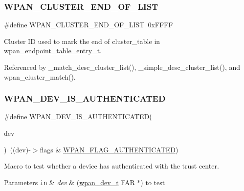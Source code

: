 \subsubsection{\texorpdfstring{W\+P\+A\+N\+\_\+\+C\+L\+U\+S\+T\+E\+R\+\_\+\+E\+N\+D\+\_\+\+O\+F\+\_\+\+L\+I\+ST}{WPAN\_CLUSTER\_END\_OF\_LIST}}
{\footnotesize\ttfamily \#define W\+P\+A\+N\+\_\+\+C\+L\+U\+S\+T\+E\+R\+\_\+\+E\+N\+D\+\_\+\+O\+F\+\_\+\+L\+I\+ST~0x\+F\+F\+FF}



Cluster ID used to mark the end of {\ttfamily cluster\+\_\+table} in \hyperlink{structwpan__endpoint__table__entry__t}{wpan\+\_\+endpoint\+\_\+table\+\_\+entry\+\_\+t}. 



Referenced by \+\_\+match\+\_\+desc\+\_\+cluster\+\_\+list(), \+\_\+simple\+\_\+desc\+\_\+cluster\+\_\+list(), and wpan\+\_\+cluster\+\_\+match().

\mbox{\label{group__wpan__aps_ga5ba1c4d72eeac9bb8bd97ee811d7aa05}} 
\subsubsection{\texorpdfstring{W\+P\+A\+N\+\_\+\+D\+E\+V\+\_\+\+I\+S\+\_\+\+A\+U\+T\+H\+E\+N\+T\+I\+C\+A\+T\+ED}{WPAN\_DEV\_IS\_AUTHENTICATED}}
{\footnotesize\ttfamily \#define W\+P\+A\+N\+\_\+\+D\+E\+V\+\_\+\+I\+S\+\_\+\+A\+U\+T\+H\+E\+N\+T\+I\+C\+A\+T\+ED(\begin{DoxyParamCaption}\item[{}]{dev }\end{DoxyParamCaption})~((dev)-\/$>$flags \& \hyperlink{group__wpan__aps_ga6508b417838fc0a043f5570b65e3f24b}{W\+P\+A\+N\+\_\+\+F\+L\+A\+G\+\_\+\+A\+U\+T\+H\+E\+N\+T\+I\+C\+A\+T\+ED})}



Macro to test whether a device has authenticated with the trust center. 


\begin{DoxyParams}[1]{Parameters}
\mbox{\tt in}  & {\em dev} & (\hyperlink{structwpan__dev__t}{wpan\+\_\+dev\+\_\+t} F\+AR $\ast$) to test \\
\hline
\end{DoxyParams}


